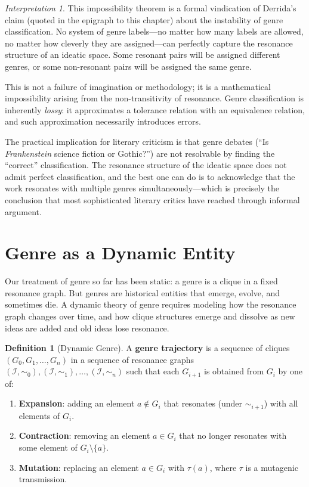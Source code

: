 \documentclass[11pt,openany]{book}
\theoremstyle{definition}
\newtheorem{definition}[axiom]{Definition}
\theoremstyle{plain}
\theoremstyle{remark}
\newtheorem{interpretation}[axiom]{Interpretation}
\newcommand{\IS}{\mathcal{I}}               %
\newcommand{\res}{\sim}                      %
\newcommand{\transmit}{\tau}                 %
\begin{document}
\begin{interpretation}
This impossibility theorem is a formal vindication of Derrida's claim (quoted in the epigraph to this chapter) about the instability of genre classification. No system of genre labels---no matter how many labels are allowed, no matter how cleverly they are assigned---can perfectly capture the resonance structure of an ideatic space. Some resonant pairs will be assigned different genres, or some non-resonant pairs will be assigned the same genre.

This is not a failure of imagination or methodology; it is a mathematical impossibility arising from the non-transitivity of resonance. Genre classification is inherently \emph{lossy}: it approximates a tolerance relation with an equivalence relation, and such approximation necessarily introduces errors.

The practical implication for literary criticism is that genre debates (``Is \emph{Frankenstein} science fiction or Gothic?'') are not resolvable by finding the ``correct'' classification. The resonance structure of the ideatic space does not admit perfect classification, and the best one can do is to acknowledge that the work resonates with multiple genres simultaneously---which is precisely the conclusion that most sophisticated literary critics have reached through informal argument.
\end{interpretation}

\section{Genre as a Dynamic Entity}

Our treatment of genre so far has been static: a genre is a clique in a fixed resonance graph. But genres are historical entities that emerge, evolve, and sometimes die. A dynamic theory of genre requires modeling how the resonance graph changes over time, and how clique structures emerge and dissolve as new ideas are added and old ideas lose resonance.

\begin{definition}[Dynamic Genre]
A \textbf{genre trajectory} is a sequence of cliques $(G_0, G_1, \ldots, G_n)$ in a sequence of resonance graphs $(\IS, \res_0), (\IS, \res_1), \ldots, (\IS, \res_n)$ such that each $G_{i+1}$ is obtained from $G_i$ by one of:
\begin{enumerate}
\item \textbf{Expansion}: adding an element $a \notin G_i$ that resonates (under $\res_{i+1}$) with all elements of $G_i$.
\item \textbf{Contraction}: removing an element $a \in G_i$ that no longer resonates with some element of $G_i \setminus \{a\}$.
\item \textbf{Mutation}: replacing an element $a \in G_i$ with $\transmit(a)$, where $\transmit$ is a mutagenic transmission.
\end{enumerate}
\end{definition}
\end{document}
